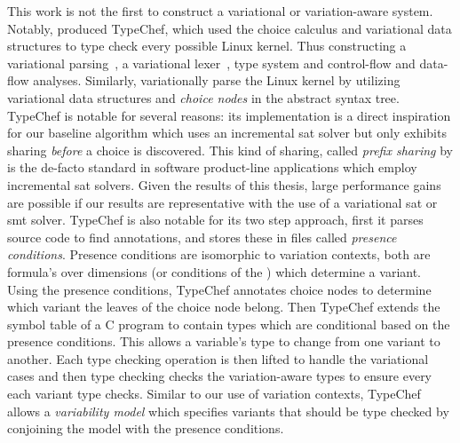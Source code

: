This work is not the first to construct a variational or variation-aware system.
Notably, \citet{KKHL:FOSD10} produced TypeChef, which used the choice calculus
and variational data structures to type check every possible Linux kernel. Thus
constructing a variational parsing~\cite{KGR+:OOPSLA11}, a variational
lexer~\cite{Kastner11partialpreprocessing}, type
system\cite{LKA+:ESECFSE13,KOE:OOPSLA12} and control-flow and data-flow
analyses\cite{LKA+:ESECFSE13}. Similarly, \citet{GG:PLDI12} variationally parse
the Linux kernel by utilizing variational data structures and \emph{choice
  nodes} in the abstract syntax tree. TypeChef is notable for several reasons:
its implementation is a direct inspiration for our baseline algorithm \vTop{}
which uses an incremental \ac{sat} solver but only exhibits sharing
\emph{before} a choice is discovered. This kind of sharing, called \emph{prefix
  sharing} by \citet{SE17fosd} is the de-facto standard in software product-line
applications which employ incremental \ac{sat} solvers. Given the results of
this thesis, large performance gains are possible if our results are
representative with the use of a variational \ac{sat} or \ac{smt} solver.
TypeChef is also notable for its two step approach, first it parses source code
to find  annotations, and stores these in files called
\emph{presence conditions}. Presence conditions are isomorphic to variation
contexts, both are \pl{} formula's over dimensions (or conditions of the
) which determine a variant. Using the presence conditions, TypeChef
annotates choice nodes to determine which variant the leaves of the choice node
belong. Then TypeChef extends the symbol table of a C program to contain types
which are conditional based on the presence conditions. This allows a variable's
type to change from one variant to another. Each type checking operation is then
lifted to handle the variational cases and then type checking checks the
variation-aware types to ensure every each variant type checks. Similar to our
use of variation contexts, TypeChef allows a \emph{variability model} which
specifies variants that should be type checked by conjoining the model with the
presence conditions.

